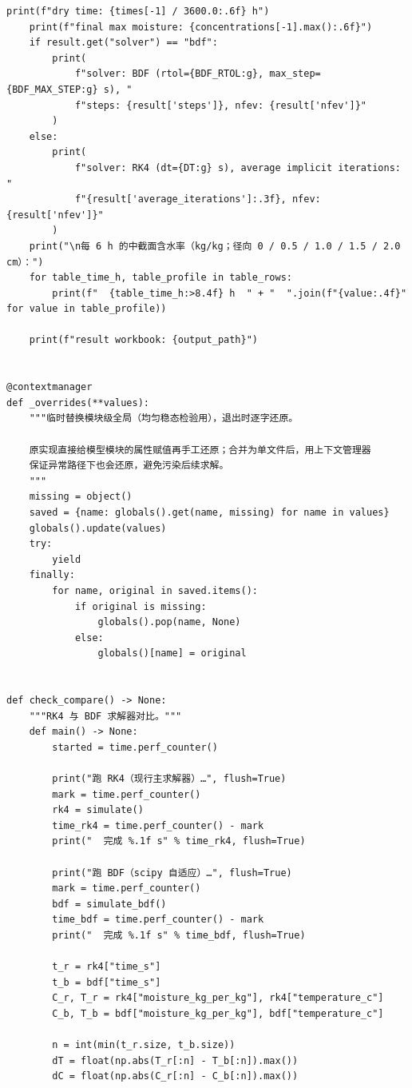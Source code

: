 \documentclass[12pt,a4paper]{ctexart}
\begin{document}
\begin{lstlisting}[caption={solve\_problem3.py }]
    print(f"dry time: {times[-1] / 3600.0:.6f} h")
    print(f"final max moisture: {concentrations[-1].max():.6f}")
    if result.get("solver") == "bdf":
        print(
            f"solver: BDF (rtol={BDF_RTOL:g}, max_step={BDF_MAX_STEP:g} s), "
            f"steps: {result['steps']}, nfev: {result['nfev']}"
        )
    else:
        print(
            f"solver: RK4 (dt={DT:g} s), average implicit iterations: "
            f"{result['average_iterations']:.3f}, nfev: {result['nfev']}"
        )
    print("\n每 6 h 的中截面含水率（kg/kg；径向 0 / 0.5 / 1.0 / 1.5 / 2.0 cm）：")
    for table_time_h, table_profile in table_rows:
        print(f"  {table_time_h:>8.4f} h  " + "  ".join(f"{value:.4f}" for value in table_profile))

    print(f"result workbook: {output_path}")


@contextmanager
def _overrides(**values):
    """临时替换模块级全局（均匀稳态检验用），退出时逐字还原。

    原实现直接给模型模块的属性赋值再手工还原；合并为单文件后，用上下文管理器
    保证异常路径下也会还原，避免污染后续求解。
    """
    missing = object()
    saved = {name: globals().get(name, missing) for name in values}
    globals().update(values)
    try:
        yield
    finally:
        for name, original in saved.items():
            if original is missing:
                globals().pop(name, None)
            else:
                globals()[name] = original


def check_compare() -> None:
    """RK4 与 BDF 求解器对比。"""
    def main() -> None:
        started = time.perf_counter()

        print("跑 RK4（现行主求解器）…", flush=True)
        mark = time.perf_counter()
        rk4 = simulate()
        time_rk4 = time.perf_counter() - mark
        print("  完成 %.1f s" % time_rk4, flush=True)

        print("跑 BDF（scipy 自适应）…", flush=True)
        mark = time.perf_counter()
        bdf = simulate_bdf()
        time_bdf = time.perf_counter() - mark
        print("  完成 %.1f s" % time_bdf, flush=True)

        t_r = rk4["time_s"]
        t_b = bdf["time_s"]
        C_r, T_r = rk4["moisture_kg_per_kg"], rk4["temperature_c"]
        C_b, T_b = bdf["moisture_kg_per_kg"], bdf["temperature_c"]

        n = int(min(t_r.size, t_b.size))
        dT = float(np.abs(T_r[:n] - T_b[:n]).max())
        dC = float(np.abs(C_r[:n] - C_b[:n]).max())


\end{lstlisting}
\end{document}

